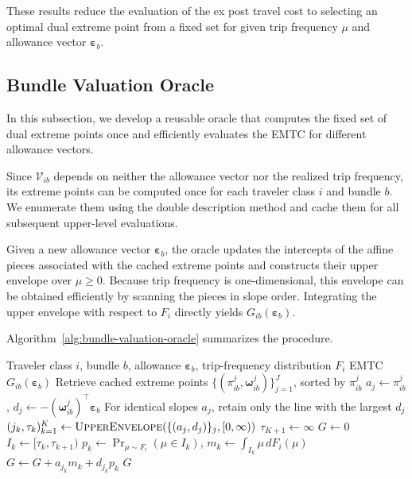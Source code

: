 \documentclass{article}
\begin{document}
These results reduce the evaluation of the ex post travel cost to selecting
an optimal dual extreme point from a fixed set for given trip frequency
$\mu$ and allowance vector $\bm\varepsilon_b$.

\subsection{Bundle Valuation Oracle}
\label{sec:bundle-valuation-oracle}

In this subsection, we develop a reusable oracle that computes the fixed
set of dual extreme points once and efficiently evaluates the EMTC for
different allowance vectors.

Since $\mathcal V_{ib}$ depends on neither the allowance vector nor the
realized trip frequency, its extreme points can be computed once for each
traveler class $i$ and bundle $b$. We enumerate them using the double
description method \citep{FukudaProdon1996} and cache them for all subsequent
upper-level evaluations.

Given a new allowance vector $\bm\varepsilon_b$, the oracle updates the
intercepts of the affine pieces associated with the cached extreme points and
constructs their upper envelope over $\mu\geq0$. Because trip frequency is
one-dimensional, this envelope can be obtained efficiently by scanning the
pieces in slope order. Integrating the upper envelope with respect to
$F_i$ directly yields $G_{ib}(\bm\varepsilon_b)$.

Algorithm~\ref{alg:bundle-valuation-oracle} summarizes the procedure.

\begin{algorithm}[t]
\caption{Bundle valuation oracle}
\label{alg:bundle-valuation-oracle}
\begin{algorithmic}[1]
\Require Traveler class $i$, bundle $b$, allowance $\bm\varepsilon_b$,
trip-frequency distribution $F_i$
\Ensure EMTC $G_{ib}(\bm\varepsilon_b)$
\State Retrieve cached extreme points
$\{(\pi_{ib}^j,\bm\omega_{ib}^j)\}_{j=1}^J$, sorted by $\pi_{ib}^j$
    \State $a_j\gets\pi_{ib}^j$,
    \quad $d_j\gets-(\bm\omega_{ib}^j)^\top\bm\varepsilon_b$
\EndFor
\State For identical slopes $a_j$, retain only the line with the largest $d_j$
\State $(j_k,\tau_k)_{k=1}^K\gets
\Call{UpperEnvelope}{\{(a_j,d_j)\}_j,[0,\infty)}$
\State $\tau_{K+1}\gets\infty$ \Comment{$\tau_1=0$; line $j_k$ is active on $[\tau_k,\tau_{k+1})$}
\State $G\gets0$
    \State $I_k\gets[\tau_k,\tau_{k+1})$
    \State $p_k\gets\Pr_{\mu\sim F_i}(\mu\in I_k)$,
    \quad $m_k\gets\int_{I_k}\mu\,dF_i(\mu)$
    \State $G\gets G+a_{j_k}m_k+d_{j_k}p_k$
\EndFor
\State \Return $G$
\end{algorithmic}
\end{algorithm}
\end{document}
